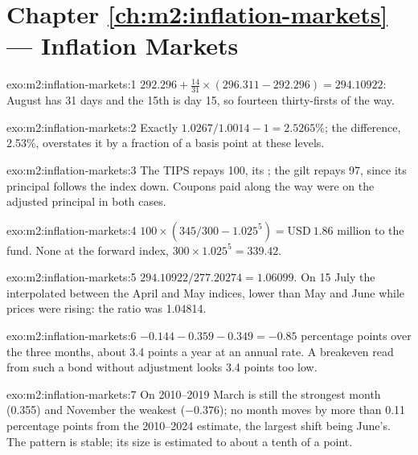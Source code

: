 \section*{Chapter \ref{ch:m2:inflation-markets} --- Inflation Markets}

\begin{solution}{exo:m2:inflation-markets:1}
$292.296 + \tfrac{14}{31}\times(296.311 - 292.296) = 294.10922$: August has 31
days and the 15th is day 15, so fourteen thirty-firsts of the way.
\end{solution}

\begin{solution}{exo:m2:inflation-markets:2}
Exactly $1.0267/1.0014 - 1 = 2.5265\%$; the difference, 2.53\%, overstates it
by a fraction of a basis point at these levels.
\end{solution}

\begin{solution}{exo:m2:inflation-markets:3}
The TIPS repays 100, its ; the gilt repays 97, since its
principal follows the index down. Coupons paid along the way were on the
adjusted principal in both cases.
\end{solution}

\begin{solution}{exo:m2:inflation-markets:4}
$100 \times (345/300 - 1.025^5) = \text{USD}~1.86$ million to the fund. None at the
forward index, $300 \times 1.025^5 = 339.42$.
\end{solution}

\begin{solution}{exo:m2:inflation-markets:5}
$294.10922/277.20274 = 1.06099$. On 15 July the  interpolated
between the April and May indices, lower than May and June while prices were
rising: the ratio was 1.04814.
\end{solution}

\begin{solution}{exo:m2:inflation-markets:6}
$-0.144 - 0.359 - 0.349 = -0.85$ percentage points over the three months, about
3.4 points a year at an annual rate. A breakeven read from such a bond without
adjustment looks 3.4 points too low.
\end{solution}

\begin{solution}{exo:m2:inflation-markets:7}
On 2010--2019 March is still the strongest month (0.355) and November the
weakest ($-0.376$); no month moves by more than 0.11 percentage points from the
2010--2024 estimate, the largest shift being June's. The pattern is stable; its
size is estimated to about a tenth of a point.
\end{solution}

